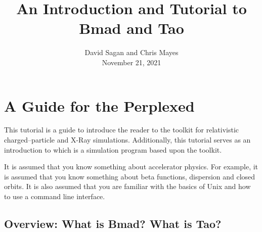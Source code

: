 \documentclass{hitec}     %
\title{An Introduction and Tutorial to Bmad and Tao}
\author{}
\date{David Sagan and Chris Mayes \\ November 21, 2021}
\newcommand{\Section}[1]{\section{#1}\vspace*{-1ex}}
\begin{document}
\maketitle

\cleardoublepage
{}
{}
\tableofcontents

\newpage

\Section{A Guide for the Perplexed}
\label{s:guide}

This tutorial is a guide to introduce the reader to the \bmad toolkit for relativistic
charged--particle and X-Ray simulations. Additionally, this tutorial serves as an introduction
to \tao which is a simulation program based upon the \bmad toolkit.

It is assumed that you know something about accelerator physics. For example, it is assumed that
you know something about beta functions, dispersion and closed orbits. It is also assumed that
you are familiar with the basics of Unix and how to use a command line interface.

\subsection{Overview: What is Bmad? What is Tao?}
\label{s:overview}
\end{document}
